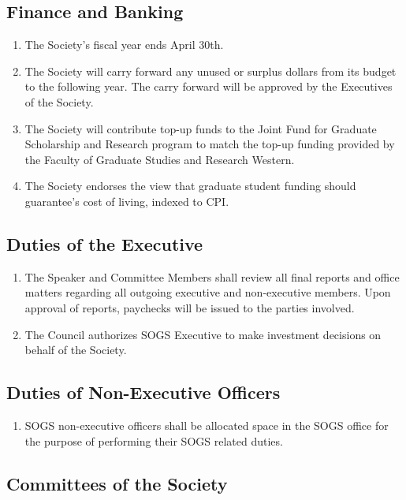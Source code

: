\subsection{Finance and Banking}
\begin{enumerate}
\item The Society's fiscal year ends April 30th. 
\item	The Society will carry forward any unused or surplus dollars from its budget to the following year. The carry forward will be approved by the Executives of the Society. 
\item	The Society will contribute top-up funds to the Joint Fund for Graduate Scholarship and Research program to match the top-up funding provided by the Faculty of Graduate Studies and Research Western.
\item	The Society endorses the view that graduate student funding should guarantee's cost of living, indexed to CPI.
\end{enumerate}

\subsection{Duties of the Executive }
\begin{enumerate}
\item 	The Speaker and Committee Members shall review all final reports and office matters regarding all outgoing executive and non-executive members. Upon approval of reports, paychecks will be issued to the parties involved.
\item  The Council authorizes SOGS Executive to make investment decisions on behalf of the Society. 
\end{enumerate}


\subsection{Duties of Non-Executive Officers }
\begin{enumerate}
\item 	SOGS non-executive officers shall be allocated space in the SOGS office for the purpose of performing their SOGS related duties.  
\end{enumerate}
 
 
\subsection{Committees of the Society }
